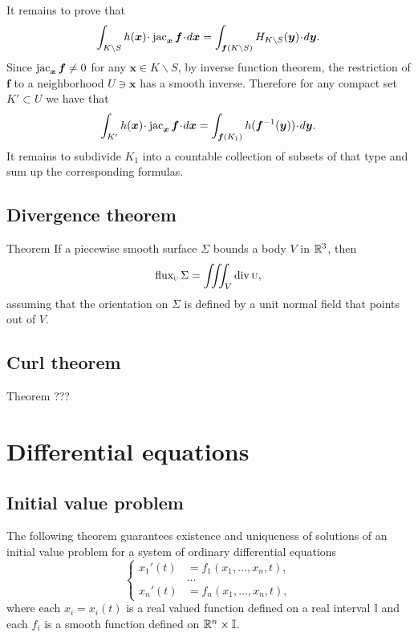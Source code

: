 It remains to prove that 
\[\int_{K\backslash S} h(\bm{x})\cdot \jac_{\bm{x}}\bm{f}\cdot d\bm{x}=\int_{\bm{f}(K\backslash S)} H_{K\backslash S}(\bm{y})\cdot d\bm{y}.\]
Since $\mathop{\rm jac}\nolimits_{\bm{x}}\bm{f}\ne 0$ for any $\bm{x}\in K\backslash S$, by inverse function theorem, the restriction of $\bm{f}$ to a neighborhood $U\ni\bm{x}$ has a smooth inverse.
Therefore for any compact set $K'\subset U$ we have that %
\[\int_{K'}h(\bm{x})\cdot \jac_{\bm{x}}\bm{f}\cdot d\bm{x}=\int_{\bm{f}(K_1)} h(\bm{f}^{-1}(\bm{y}))\cdot d\bm{y}.\]
It remains to subdivide $K_1$ into a countable collection of subsets of that type and sum up the corresponding formulas.\qeds

\section{Divergence theorem}

\begin{thm}{Theorem}\label{thm:div}
If a piecewise smooth surface $\Sigma$ bounds a body $V$ in $\mathbb{R}^3$, then
\[\mathop{\rm flux}\nolimits_{\textsc u}\Sigma=\iiint_V\mathop{\rm div}\nolimits \textsc u,\]
assuming that the orientation on $\Sigma$ is defined by a unit normal field that points out of $V$.
\end{thm}


\section{Curl theorem}

\begin{thm}{Theorem}\label{thm:curl}
???
\end{thm}



\chapter{Differential equations}

\section{Initial value problem}

The following theorem guarantees existence and uniqueness of solutions of an initial value problem
for a system of ordinary differential equations
\[
\begin{cases}
x_1'(t)&=f_1(x_1,\dots,x_n,t),
\\
&\dots
\\
x_n'(t)&=f_n(x_1,\dots,x_n,t),
\end{cases}
\]
where each $x_i=x_i(t)$ is a real valued function defined on a real interval $\mathbb{I}$
and each $f_i$ is a smooth function defined on $\mathbb{R}^n\times \mathbb{I}$.


